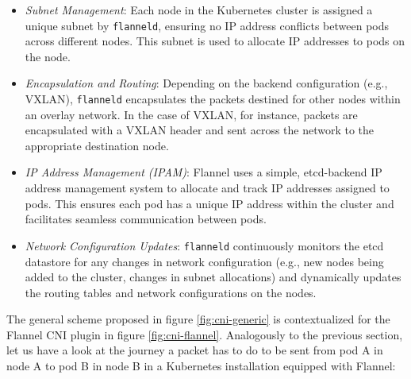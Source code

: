 \begin{itemize}
  \item \textit{Subnet Management}: Each node in the Kubernetes cluster is
    assigned a unique subnet by \texttt{flanneld}, ensuring no IP address
    conflicts between pods across different nodes. This subnet is used to
    allocate IP addresses to pods on the node.
  \item \textit{Encapsulation and Routing}: Depending on the backend
    configuration (e.g., VXLAN), \texttt{flanneld}
    encapsulates the packets destined for other nodes within an overlay network.
    In the case of VXLAN, for instance, packets are encapsulated with a VXLAN
    header and sent across the network to the appropriate destination node.
 \item \textit{IP Address Management (IPAM)}: Flannel uses a simple,
   etcd-backend IP address management system to allocate and track IP addresses
   assigned to pods. This ensures each pod has a unique IP address within the
   cluster and facilitates seamless communication between pods.
  \item \textit{Network Configuration Updates}: \texttt{flanneld} continuously
    monitors the etcd datastore for any changes in network configuration (e.g.,
    new nodes being added to the cluster, changes in subnet allocations) and
    dynamically updates the routing tables and network configurations on the
    nodes.
\end{itemize}

The general scheme proposed in figure \ref{fig:cni-generic} is contextualized
for the Flannel CNI plugin in figure \ref{fig:cni-flannel}.  Analogously to the
previous section, let us have a look at the journey a packet has to do to be
sent from pod A in node A to pod B in node B in a Kubernetes installation
equipped with Flannel:

